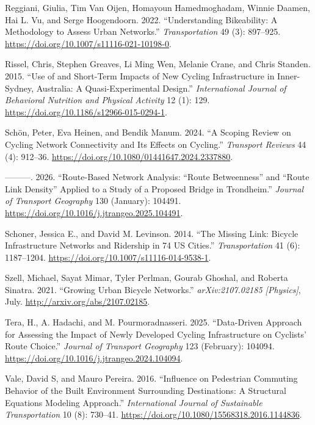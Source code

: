 \documentclass[
  sn-nature,
]{sn-jnl}
\newlength{\cslhangindent}
\newenvironment{CSLReferences}[2] %
 {\begin{list}{}{%
  \setlength{\itemindent}{0pt}
  \setlength{\leftmargin}{0pt}
  \setlength{\parsep}{0pt}
  \ifodd #1
   \setlength{\leftmargin}{\cslhangindent}
   \setlength{\itemindent}{-1\cslhangindent}
  \fi
  \setlength{\itemsep}{#2\baselineskip}}}
 {\end{list}}
\begin{document}
\begin{CSLReferences}{1}{0}
Reggiani, Giulia, Tim Van Oijen, Homayoun Hamedmoghadam, Winnie Daamen,
Hai L. Vu, and Serge Hoogendoorn. 2022. {``Understanding Bikeability: A
Methodology to Assess Urban Networks.''} \emph{Transportation} 49 (3):
897--925. \url{https://doi.org/10.1007/s11116-021-10198-0}.

Rissel, Chris, Stephen Greaves, Li Ming Wen, Melanie Crane, and Chris
Standen. 2015. {``Use of and Short-Term Impacts of New Cycling
Infrastructure in Inner-Sydney, Australia: A Quasi-Experimental
Design.''} \emph{International Journal of Behavioral Nutrition and
Physical Activity} 12 (1): 129.
\url{https://doi.org/10.1186/s12966-015-0294-1}.

Schön, Peter, Eva Heinen, and Bendik Manum. 2024. {``A Scoping Review on
Cycling Network Connectivity and Its Effects on Cycling.''}
\emph{Transport Reviews} 44 (4): 912--36.
\url{https://doi.org/10.1080/01441647.2024.2337880}.

---------. 2026. {``Route-Based Network Analysis: {``}Route
Betweenness{''} and {``}Route Link Density{''} Applied to a Study of a
Proposed Bridge in Trondheim.''} \emph{Journal of Transport Geography}
130 (January): 104491.
\url{https://doi.org/10.1016/j.jtrangeo.2025.104491}.

Schoner, Jessica E., and David M. Levinson. 2014. {``The Missing Link:
Bicycle Infrastructure Networks and Ridership in 74 US Cities.''}
\emph{Transportation} 41 (6): 1187--1204.
\url{https://doi.org/10.1007/s11116-014-9538-1}.

Szell, Michael, Sayat Mimar, Tyler Perlman, Gourab Ghoshal, and Roberta
Sinatra. 2021. {``Growing Urban Bicycle Networks.''}
\emph{arXiv:2107.02185 {[}Physics{]}}, July.
\url{http://arxiv.org/abs/2107.02185}.

Tera, H., A. Hadachi, and M. Pourmoradnasseri. 2025. {``Data-Driven
Approach for Assessing the Impact of Newly Developed Cycling
Infrastructure on Cyclists' Route Choice.''} \emph{Journal of Transport
Geography} 123 (February): 104094.
\url{https://doi.org/10.1016/j.jtrangeo.2024.104094}.

Vale, David S, and Mauro Pereira. 2016. {``Influence on Pedestrian
Commuting Behavior of the Built Environment Surrounding Destinations: A
Structural Equations Modeling Approach.''} \emph{International Journal
of Sustainable Transportation} 10 (8): 730--41.
\url{https://doi.org/10.1080/15568318.2016.1144836}.


\end{CSLReferences}
\end{document}
